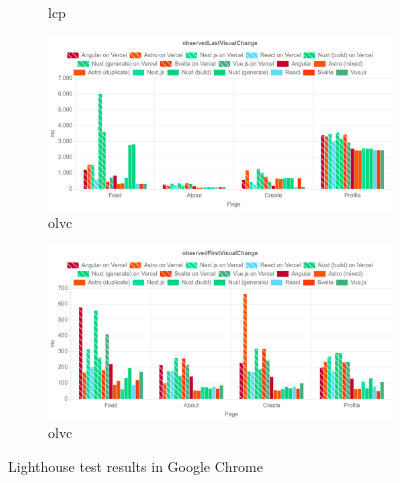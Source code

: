 \documentclass[a4paper, 12pt]{article}
\begin{document}
\begin{figure}[!h]
\begin{subfigure}{0.49\linewidth}
\begin{center}
    \end{center}
    \caption{\acrfull{lcp}}\label{subfig:LH:largestContentfulPaint}
  \end{subfigure}
  \begin{subfigure}{0.49\linewidth}
    \begin{center}
      \includegraphics[width=\linewidth, keepaspectratio]{img/lighthouse-results/OLVC.png}
    \end{center}
    \caption{\acrfull{olvc}}\label{subfig:LH:observedLastVisualChange}
  \end{subfigure}
  \begin{subfigure}{0.49\linewidth}
    \begin{center}
      \includegraphics[width=\linewidth, keepaspectratio]{img/lighthouse-results/OFVC.png}
    \end{center}
    \caption{\acrfull{olvc}}\label{subfig:LH:observedLastVisualChange}
  \end{subfigure}
  \caption{Lighthouse test results in Google Chrome}\label{fig:lighthouseResults}
\end{figure}
\end{document}
